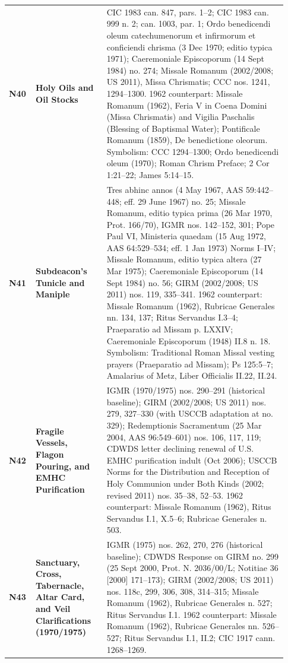 {\begin{longtable}{>{\raggedright\arraybackslash}p{0.08\linewidth}>{\raggedright\arraybackslash}p{0.24\linewidth}>{\raggedright\arraybackslash}p{0.61\linewidth}}
\textbf{N40} & \textbf{Holy Oils and Oil Stocks} & CIC 1983 can. 847, pars. 1--2; CIC 1983 can. 999 n. 2; can. 1003, par. 1; Ordo benedicendi oleum catechumenorum et infirmorum et conficiendi chrisma (3 Dec 1970; editio typica 1971); Caeremoniale Episcoporum (14 Sept 1984) no. 274; Missale Romanum (2002/2008; US 2011), Missa Chrismatis; CCC nos. 1241, 1294--1300. 1962 counterpart: Missale Romanum (1962), Feria V in Coena Domini (Missa Chrismatis) and Vigilia Paschalis (Blessing of Baptismal Water); Pontificale Romanum (1859), De benedictione oleorum. Symbolism: CCC 1294--1300; Ordo benedicendi oleum (1970); Roman Chrism Preface; 2 Cor 1:21--22; James 5:14--15. \\
\textbf{N41} & \textbf{Subdeacon's Tunicle and Maniple} & Tres abhinc annos (4 May 1967, AAS 59:442--448; eff. 29 June 1967) no. 25; Missale Romanum, editio typica prima (26 Mar 1970, Prot. 166/70), IGMR nos. 142--152, 301; Pope Paul VI, Ministeria quaedam (15 Aug 1972, AAS 64:529--534; eff. 1 Jan 1973) Norms I--IV; Missale Romanum, editio typica altera (27 Mar 1975); Caeremoniale Episcoporum (14 Sept 1984) no. 56; GIRM (2002/2008; US 2011) nos. 119, 335--341. 1962 counterpart: Missale Romanum (1962), Rubricae Generales nn. 134, 137; Ritus Servandus I.3--4; Praeparatio ad Missam p. LXXIV; Caeremoniale Episcoporum (1948) II.8 n. 18. Symbolism: Traditional Roman Missal vesting prayers (Praeparatio ad Missam); Ps 125:5--7; Amalarius of Metz, Liber Officialis II.22, II.24. \\
\textbf{N42} & \textbf{Fragile Vessels, Flagon Pouring, and EMHC Purification} & IGMR (1970/1975) nos. 290--291 (historical baseline); GIRM (2002/2008; US 2011) nos. 279, 327--330 (with USCCB adaptation at no. 329); Redemptionis Sacramentum (25 Mar 2004, AAS 96:549--601) nos. 106, 117, 119; CDWDS letter declining renewal of U.S. EMHC purification indult (Oct 2006); USCCB Norms for the Distribution and Reception of Holy Communion under Both Kinds (2002; revised 2011) nos. 35--38, 52--53. 1962 counterpart: Missale Romanum (1962), Ritus Servandus I.1, X.5--6; Rubricae Generales n. 503. \\
\textbf{N43} & \textbf{Sanctuary, Cross, Tabernacle, Altar Card, and Veil Clarifications (1970/1975)} & IGMR (1975) nos. 262, 270, 276 (historical baseline); CDWDS Response on GIRM no. 299 (25 Sept 2000, Prot. N. 2036/00/L; Notitiae 36 [2000] 171--173); GIRM (2002/2008; US 2011) nos. 118c, 299, 306, 308, 314--315; Missale Romanum (1962), Rubricae Generales n. 527; Ritus Servandus I.1. 1962 counterpart: Missale Romanum (1962), Rubricae Generales nn. 526--527; Ritus Servandus I.1, II.2; CIC 1917 cann. 1268--1269. \\
\bottomrule
\end{longtable}}
